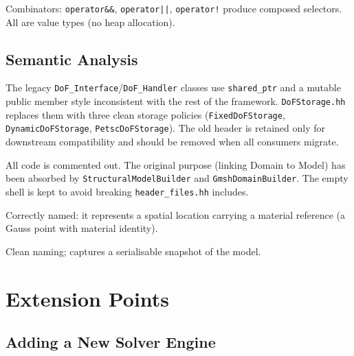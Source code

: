 Combinators: \texttt{operator\&\&}, \texttt{operator||}, \texttt{operator!}
produce composed selectors.  All are value types (no heap allocation).


\subsection{Semantic Analysis}
\label{sec:arch:model:semantics}

\begin{description}[style=nextline]
  \item[\texttt{DoF.hh} vs.\ \texttt{DoFStorage.hh}]
    The legacy \texttt{DoF\_Interface}/\texttt{DoF\_Handler} classes use
    \texttt{shared\_ptr} and a mutable public member style inconsistent
    with the rest of the framework.  \texttt{DoFStorage.hh} replaces them
    with three clean storage policies (\texttt{FixedDoFStorage},
    \texttt{DynamicDoFStorage}, \texttt{PetscDoFStorage}).  The old header
    is retained only for downstream compatibility and should be removed
    when all consumers migrate.

  \item[\texttt{ModelBuilder.hh}]
    All code is commented out.  The original purpose (linking Domain to
    Model) has been absorbed by \texttt{StructuralModelBuilder} and
    \texttt{GmshDomainBuilder}.  The empty shell is kept to avoid breaking
    \texttt{header\_files.hh} includes.

  \item[\texttt{MaterialPoint.hh}]
    Correctly named: it represents a spatial location carrying a material
    reference (a Gauss point with material identity).

  \item[\texttt{ModelState.hh}]
    Clean naming; captures a serialisable snapshot of the model.
\end{description}


\section{Extension Points}
\label{sec:arch:extension}


\subsection{Adding a New Solver Engine}
\label{sec:arch:ext:solver}

